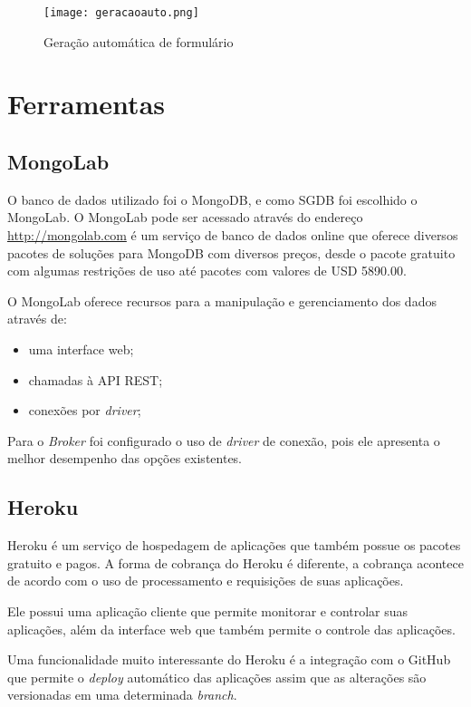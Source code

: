 \begin{figure}[!htb]
  \centering
  \texttt{[image: geracaoauto.png]} %
  \caption[Geração automática de formulário]{Geração automática de formulário}
  \label{fig:geracaoauto}
\end{figure}

\section{Ferramentas}
\subsection{MongoLab}
O banco de dados utilizado foi o MongoDB, e como SGDB foi escolhido o MongoLab.
O MongoLab pode ser acessado através do endereço \url{http://mongolab.com} é um serviço de banco de dados online que oferece diversos pacotes de soluções para MongoDB com diversos preços, desde o pacote gratuito com algumas restrições de uso até pacotes com valores de USD 5890.00.

O MongoLab oferece recursos para a manipulação e gerenciamento dos dados através de:
\begin{itemize}
\item uma interface web;
\item chamadas à API REST;
\item conexões por \textit{driver};
\end{itemize}

Para o \textit{Broker} foi configurado o uso de \textit{driver} de conexão, pois ele apresenta o melhor desempenho das opções existentes.

\subsection{Heroku}
Heroku é um serviço de hospedagem de aplicações que também possue os pacotes gratuito e pagos. A forma de cobrança do Heroku é diferente, a cobrança acontece de acordo com o uso de processamento e requisições de suas aplicações.

Ele possui uma aplicação cliente que permite monitorar e controlar suas aplicações, além da interface web que também permite o controle das aplicações.

Uma funcionalidade muito interessante do Heroku é a integração com o GitHub que permite o \textit{deploy} automático das aplicações assim que as alterações são versionadas em uma determinada \textit{branch}.

